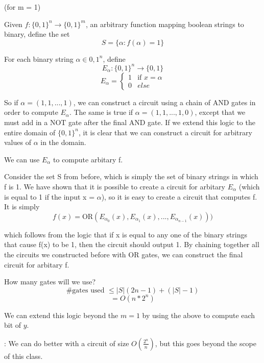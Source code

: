 {
(for m = 1)

Given $f: \{0,1\}^n \rightarrow \{0,1\}^m$, an arbitrary function mapping boolean strings to binary, define the set 
\[
    S = \{\alpha: f(\alpha) = 1\}
\]

For each binary string $\alpha \in {0, 1}^n$, define 
\[
    E_\alpha: \{0, 1\}^n \rightarrow \{0,1\}    
\]
\begin{equation}
    E_\alpha = 
    \begin{cases}
        1 & \text{if } x = \alpha \\
        0 & else
    \end{cases}
\end{equation}

\begin{example}
    So if $\alpha = (1, 1, ..., 1)$, we can construct a circuit using a chain of AND gates in order to compute $E_\alpha$. The same is true if $\alpha = (1, 1, ..., 1, 0)$, except that we must add in a NOT gate after the final AND gate. If we extend this logic to the entire domain of $\{0,1\}^n$, it is clear that we can construct a circuit for arbitrary values of $\alpha$ in the domain. 
\end{example}

We can use $E_\alpha$ to compute arbitary f. 

Consider the set S from before, which is simply the set of binary strings in which f is 1. We have shown that it is possible to create a circuit for arbitary $E_\alpha$ (which is equal to 1 if the input x = $\alpha$), so it is easy to create a circuit that computes f. It is simply
\[
    f(x) = \text{OR}(E_{\alpha_0}(x), E_{\alpha_1}(x), ..., E_{\alpha_{n-1}}(x)))
\]

which follows from the logic that if x is equal to any one of the binary strings that cause f(x) to be 1, then the circuit should output 1. By chaining together all the circuits we constructed before with OR gates, we can construct the final circuit for arbitary f.
}

How many gates will we use? 
\[
    \text{\# gates used } \le |S|(2n - 1) + (|S| - 1)
\]
\[
    = O(n * 2^n)  
\]

We can extend this logic beyond the $m = 1$ by using the above to compute each bit of $y$.

: We can do better with a circuit of size $O(\frac{2^n}{n})$, but this goes beyond the scope of this class.

